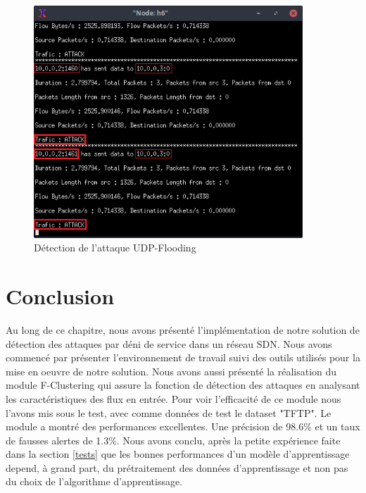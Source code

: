\begin{figure}[h]
\centering
\includegraphics[width=0.9\textwidth]{Figures/simulation/mininet/IDS/attack_udp_flood}
\decoRule
\caption{Détection de l'attaque UDP-Flooding}
\label{fig:FloodingAttack}
\end{figure}

\section{Conclusion}
Au long de ce chapitre, nous avons présenté l'implémentation de notre solution de détection des attaques par déni de service dans un réseau SDN. Nous avons commencé par présenter l'environnement de travail suivi des outils utilisés pour la mise en oeuvre de notre solution. Nous avons aussi présenté la réalisation du module F-Clustering qui assure la fonction de détection des attaques en analysant les caractéristiques des flux en entrée. Pour voir l'efficacité de ce module nous l'avons mis sous le test, avec comme données de test le dataset "TFTP". Le module a montré des performances excellentes. Une précision de 98.6\% et un taux de fausses alertes de 1.3\%. Nous avons conclu, après la petite expérience faite dans la section \ref{tests} que les bonnes performances d'un modèle d'apprentissage depend, à grand part, du prétraitement des données d'apprentissage et non pas du choix de l'algorithme d'apprentissage.\\

